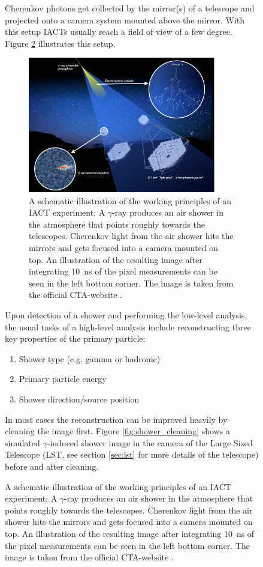 \begin{figure}
Cherenkov photons get collected by the mirror(s) of a telescope
and projected onto a camera system mounted above the mirror.
With this setup IACTs usually reach a field of view of a few degree.
Figure \ref{fig:iact_mirror_camera} illustrates this setup.

\begin{figure}
	\centering
	\captionsetup{width=0.9\linewidth}
	\includegraphics[width=0.9\textwidth]{images/cta47.png}
	\caption{A schematic illustration of the working principles of 
	an IACT experiment:
	A $\gamma$-ray produces an air shower in the atmosphere
	that points roughly towards the telescopes.
	Cherenkov light from the air shower 
	hits the mirrors and gets focused into a camera mounted on top.
	An illustration of the resulting image after integrating 
	\SI{10}{\nano\second} of the pixel measurements
	can be seen in the left bottom corner.
	The image is taken from the official CTA-website \cite{cta_web}.}
	\label{fig:iact_mirror_camera}
\end{figure}


Upon detection of a shower and performing the low-level analysis,
the usual tasks of a high-level analysis include reconstructing 
three key properties of the primary particle:
\begin{enumerate}
	\item{Shower type (e.g. gamma or hadronic)}
	\item{Primary particle energy}
	\item{Shower direction/source position}
\end{enumerate}

In most cases the reconstruction can be improved heavily by cleaning the image first.
Figure \ref{fig:shower_cleaning} shows a simulated $\gamma$-induced shower image
in the camera of the Large Sized Telescope (LST, see section \ref{sec:lst} for more details of the telescope)
before and after cleaning.


\end{figure}
